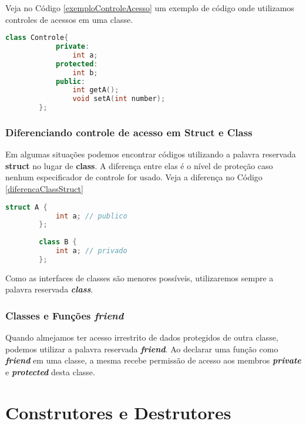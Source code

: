 \documentclass[a4paper, 12pt]{article}
\begin{document}
	Veja no Código \ref{exemploControleAcesso} um exemplo de código onde utilizamos controles de acessos em uma classe.
	
	\vspace{5cm}
	
	\begin{lstlisting}[language=C++, style=mystyle, caption={Exemplo de classe utilizando controle de acesso}, label=exemploControleAcesso]		
		class Controle{
			private:
				int a;
			protected:
				int b;
			public:
				int getA();
				void setA(int number);
		};
	\end{lstlisting}

	\subsubsection{Diferenciando controle de acesso em Struct e Class}
	
	Em algumas situações podemos encontrar códigos utilizando a palavra reservada \textbf{struct} no lugar de \textbf{class}. A diferença entre elas é o nível de proteção caso nenhum especificador de controle for usado. Veja a diferença no Código \ref{diferencaClassStruct}
	
	\begin{lstlisting}[language=C++, style=mystyle, caption={Diferença nível acesso struct e class.}, label=diferencaClassStruct, extendedchars=true]		
		struct A {
			int a; // publico
		};
	
		class B {
			int a; // privado
		};
	\end{lstlisting}

	Como as interfaces de classes são menores possíveis, utilizaremos sempre a palavra reservada \textbf{\textit{class}}.
	
	\subsubsection{Classes e Funções \textbf{\textit{friend}}}
	
	Quando almejamos ter acesso irrestrito de dados protegidos de outra classe, podemos utilizar a palavra reservada \textbf{\textit{friend}}. Ao declarar uma função como \textit{\textbf{friend}} em uma classe, a mesma recebe permissão de acesso aos membros \textit{\textbf{private}} e \textit{\textbf{protected}} desta classe.
	
	\section{Construtores e Destrutores}
	
\end{document}

